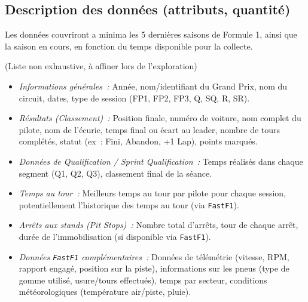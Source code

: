 \documentclass[11pt, a4paper]{article}
\newcommand{\lib}[1]{\texttt{#1}}
\begin{document}
\subsection{Description des données (attributs, quantité)}
\begin{description}[style=standard, itemsep=0.5em, leftmargin=1.5em]
    \item[Période temporelle couverte~:] Les données couvriront a minima les 5 dernières saisons de Formule 1, ainsi que la saison en cours, en fonction du temps disponible pour la collecte. %
    \item[Attributs envisagés par session~:] (Liste non exhaustive, à affiner lors de l'exploration)
    \begin{itemize}[label=\textbullet, itemsep=0.2em, leftmargin=*]
        \item \textit{Informations générales~:} Année, nom/identifiant du Grand Prix, nom du circuit, dates, type de session (FP1, FP2, FP3, Q, SQ, R, SR).
        \item \textit{Résultats (Classement)~:} Position finale, numéro de voiture, nom complet du pilote, nom de l'écurie, temps final ou écart au leader, nombre de tours complétés, statut (ex~: Fini, Abandon, +1 Lap), points marqués.
        \item \textit{Données de Qualification / Sprint Qualification~:} Temps réalisés dans chaque segment (Q1, Q2, Q3), classement final de la séance.
        \item \textit{Temps au tour~:} Meilleurs temps au tour par pilote pour chaque session, potentiellement l'historique des temps au tour (via \lib{FastF1}).
        \item \textit{Arrêts aux stands (Pit Stops)~:} Nombre total d'arrêts, tour de chaque arrêt, durée de l'immobilisation (si disponible via \lib{FastF1}).
        \item \textit{Données \lib{FastF1} complémentaires~:} Données de télémétrie (vitesse, RPM, rapport engagé, position sur la piste), informations sur les pneus (type de gomme utilisé, usure/tours effectués), temps par secteur, conditions météorologiques (température air/piste, pluie).
    \end{itemize}
\end{description}
\end{document}
